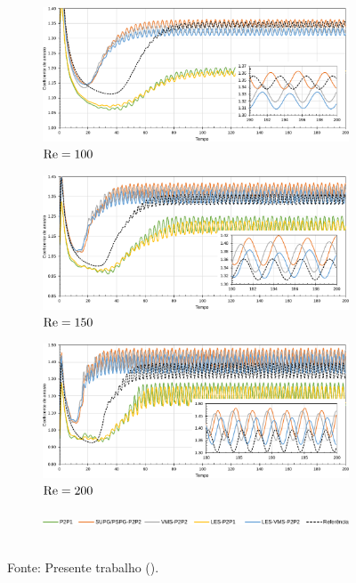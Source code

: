 \begin{figure}[h!]
    \centering
    \caption{Escoamento sobre cilindro - Coeficiente de arrasto ao longo do tempo para malha mais grosseira.}
    \begin{subfigure}{\textwidth}
        \centering
        \includegraphics[width=.85\linewidth]{Figuras/cylinder/coarse/Cd100.pdf}
        \caption{$\mathrm{Re}=100$}
    \end{subfigure}
    \begin{subfigure}{\textwidth}
        \centering
        \includegraphics[width=.85\linewidth]{Figuras/cylinder/coarse/Cd150.pdf}
        \caption{$\mathrm{Re}=150$}
    \end{subfigure}
    \begin{subfigure}{\textwidth}
        \centering
        \includegraphics[width=.85\linewidth]{Figuras/cylinder/coarse/Cd200.pdf}
        \caption{$\mathrm{Re}=200$}
    \end{subfigure}
    \begin{subfigure}{.8\textwidth}
        \includegraphics[width=\linewidth]{Figuras/cylinder/legenda2.pdf}
    \end{subfigure}
    \\Fonte: Presente trabalho (\the\year).
    \label{fig:cyl-Cd2}
\end{figure}

